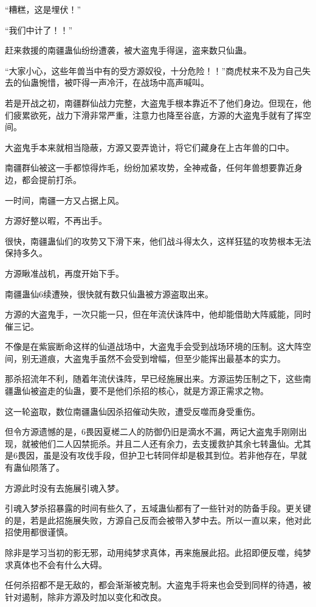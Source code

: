 \begin{this_body}
“糟糕，这是埋伏！”

“我们中计了！！”

赶来救援的南疆蛊仙纷纷遭袭，被大盗鬼手得逞，盗来数只仙蛊。

“大家小心，这些年兽当中有的受方源奴役，十分危险！！”商虎杖来不及为自己失去的仙蛊惋惜，被吓得一声冷汗，在战场中高声喊叫。

若是开战之初，南疆群仙战力完整，大盗鬼手根本靠近不了他们身边。但现在，他们疲累欲死，战力下滑非常严重，注意力也降至谷底，方源的大盗鬼手就有了挥空间。

大盗鬼手本来就相当隐蔽，方源又耍弄诡计，将它们藏身在上古年兽的口中。

南疆群仙被这一手都惊得炸毛，纷纷加紧攻势，全神戒备，任何年兽想要靠近身边，都会提前打杀。

一时间，南疆一方又占据上风。

方源好整以暇，不再出手。

很快，南疆蛊仙们的攻势又下滑下来，他们战斗得太久，这样狂猛的攻势根本无法保持多久。

方源瞅准战机，再度开始下手。

南疆蛊仙6续遭殃，很快就有数只仙蛊被方源盗取出来。

方源的大盗鬼手，一次只能一只，但在年流伏诛阵中，他却能借助大阵威能，同时催三记。

不像是在紫宸断命这样的仙道战场中，大盗鬼手会受到战场环境的压制。这大阵空间，别无道痕，大盗鬼手虽然不会受到增幅，但至少能挥出最基本的实力。

那杀招流年不利，随着年流伏诛阵，早已经施展出来。方源运势压制之下，这些南疆蛊仙被盗走的仙蛊，要不是他们杀招的核心，就是方源正需求之物。

这一轮盗取，数位南疆蛊仙因杀招催动失败，遭受反噬而身受重伤。

但令方源遗憾的是，6畏因夏槎二人的防御仍旧是滴水不漏，两记大盗鬼手刚刚出现，就被他们二人囚禁扼杀。并且二人还有余力，去支援救护其余七转蛊仙。尤其是6畏因，虽是没有攻伐手段，但护卫七转同伴却是极其到位。若非他存在，早就有蛊仙陨落了。

方源此时没有去施展引魂入梦。

引魂入梦杀招暴露的时间有些久了，五域蛊仙都有了一些针对的防备手段。更关键的是，若是此招施展失败，方源自己反而会被带入梦中去。所以一直以来，他对此招使用都很谨慎。

除非是学习当初的影无邪，动用纯梦求真体，再来施展此招。此招即便反噬，纯梦求真体也不会有什么大碍。

任何杀招都不是无敌的，都会渐渐被克制。大盗鬼手将来也会受到同样的待遇，被针对遏制，除非方源及时加以变化和改良。


\end{this_body}
